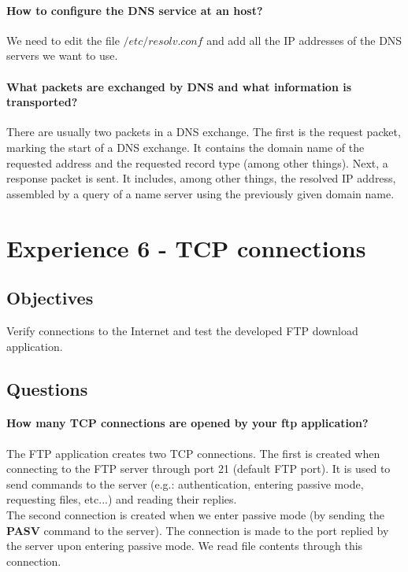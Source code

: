 \documentclass[11pt]{report}
\begin{document}
\paragraph{How to configure the DNS service at an host?}
We need to edit the file $/etc/resolv.conf$ and add all the IP addresses of the DNS
servers we want to use.

\paragraph{What packets are exchanged by DNS and what information is transported?}
There are usually two packets in a DNS exchange. The first is the request packet,
marking the start of a DNS exchange. It contains the domain name of the requested
address and the requested record type (among other things). Next, a response packet
is sent. It includes, among other things, the resolved IP address, assembled
by a query of a name server using the previously given domain name.

\section{Experience 6 - TCP connections}

\subsection{Objectives}
Verify connections to the Internet and test the developed FTP download application.

\subsection{Questions}
\paragraph{How many TCP connections are opened by your ftp application?}
The FTP application creates two TCP connections. The first is created when connecting
to the FTP server through port 21 (default FTP port). It is used to send commands
to the server (e.g.: authentication, entering passive mode, requesting files, etc...)
and reading their replies.\\
The second connection is created when we enter passive mode (by sending the \textbf{PASV}
command to the server). The connection is made to the port replied by the server
upon entering passive mode. We read file contents through this connection.
\end{document}

